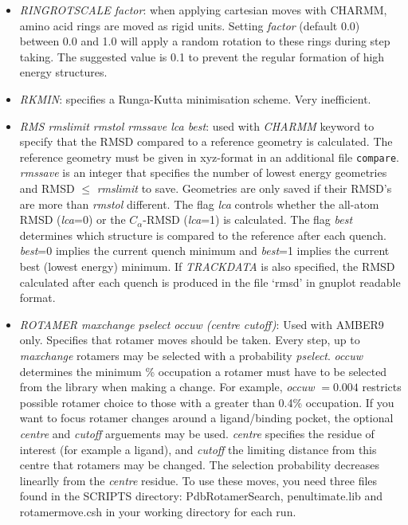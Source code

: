 \documentclass[12pt,a4paper,dvips]{article}
\begin{document}
\begin{itemize}
\item {\it RINGROTSCALE factor\/}: when applying cartesian moves with CHARMM, amino acid rings are moved as rigid units. Setting {\it factor} (default 0.0) between 0.0 and 1.0 will apply a random rotation to these rings during step taking. The suggested value is 0.1 to prevent the regular formation of high energy structures. 

\item {\it RKMIN\/}: specifies a Runga-Kutta minimisation scheme. 
Very inefficient.

\item{\it RMS rmslimit rmstol rmssave lca best}: used with {\it CHARMM} keyword to
specify that the RMSD compared to a reference geometry is calculated. The reference geometry must 
be given in xyz-format in an additional file {\tt compare}. {\it rmssave} is an integer 
that specifies the number of lowest energy geometries and RMSD $\le$ {\it rmslimit}
to save. Geometries are only saved if their RMSD's are more than {\it rmstol} 
different. The flag {\it lca} controls whether the all-atom RMSD ({\it lca}=0) or the $C_{\alpha}$-RMSD 
({\it lca}=1) is calculated. The flag {\it best} determines which structure is compared to the reference
after each quench. {\it best}=0 implies the current quench minimum and {\it best}=1 implies the current best (lowest energy) minimum. If {\it TRACKDATA} is also specified, the RMSD calculated after each quench is produced in the file `rmsd' in gnuplot readable format.

\item {\it ROTAMER maxchange pselect occuw (centre cutoff)\/}: Used with AMBER9 only. Specifies that rotamer moves should be taken. Every step, up to {\it maxchange} rotamers may be selected with a probability {\it pselect}. {\it occuw} determines the minimum \% occupation a rotamer must have to be selected from the library\cite{lovelljm00} when making a change. For example, {\it occuw} $= 0.004$ restricts possible rotamer choice to those with a greater than 0.4\% occupation. If you want to focus rotamer changes around a ligand/binding pocket, the optional {\it centre} and {\it cutoff} arguements may be used. {\it centre} specifies the residue of interest (for example a ligand), and {\it cutoff} the limiting distance from this centre that rotamers may be changed. The selection probability decreases linearlly from the {\it centre} residue. To use these moves, you need three files found in the SCRIPTS directory: PdbRotamerSearch, penultimate.lib and rotamermove.csh in your working directory for each run. 


\end{itemize}
\end{document}
